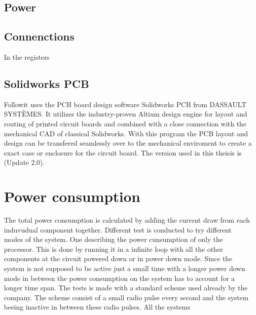 \subsection{Power}


\subsection{Connenctions}
 In the registers 


\subsection{Solidworks PCB}
Followit uses the PCB board design software Solidworks PCB from DASSAULT SYSTÈMES. It utilizes the industry-proven Altium design engine for layout and routing of printed circuit boards and combined with a close connection with the mechanical CAD of classical Solidworks. With this program the PCB layout and design can be transfered seamlessly over to the mechanical enviroment to create a exact case or enclosure for the circuit board. The version used in this theisis is (Update 2.0).


\section{Power consumption}
 The total power consumption is calculated by adding the current draw from each induvudual component together.  Different test is conducted to try different modes of the system. One describing the power cunsumption of only the processor. This is done by running it in a infinite loop with all the other components at the circuit powered down or in power down mode. Since the system is not supposed to be active just a small time with a longer power down mode in between the power consumption on the system has to account for a longer time span. The tests is made with a standard scheme used already by the company. The scheme consist of a small radio pulse every second and the system beeing inactive in between these radio pulses. 
All the systems 
